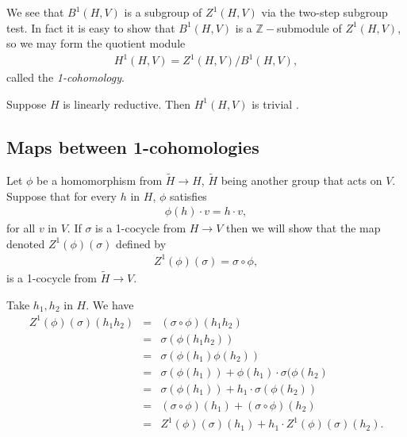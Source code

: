We see that $B^1(H, V)$ is a subgroup of $Z^1(H, V)$ via the two-step subgroup test. In fact it is easy to show that $B^1(H, V)$ is a $\mathbb{Z}-$submodule of $Z^1(H, V)$, so we may form the quotient module
\begin{eqnarray*}
	H^1\left(H, V\right) = Z^1\left(H, V\right) / B^1\left(H, V\right),
\end{eqnarray*}
called the \emph{1-cohomology}.
\begin{lemma} Suppose $H$ is linearly reductive. Then $H^1(H, V)$ is trivial \cite{hochschild1965structure}.
\end{lemma}

\subsection{Maps between 1-cohomologies}
Let $\phi$ be a homomorphism from $\tilde{H}\rightarrow H$, $\tilde{H}$ being another group that acts on $V$. Suppose that for every $h$ in $H$, $\phi$ satisfies
\begin{eqnarray*}
	\phi(h)\cdot v = h\cdot v,
\end{eqnarray*}
for all $v$ in $V$. If $\sigma$ is a 1-cocycle from $H\rightarrow V$ then we will show that the map denoted $Z^1(\phi)(\sigma)$ defined by
\begin{eqnarray*}
	Z^1(\phi)(\sigma) = \sigma \circ \phi,
\end{eqnarray*}
is a 1-cocycle from $\tilde{H}\rightarrow V$.

Take $h_1, h_2$ in $H$. We have
\begin{eqnarray*}
	Z^1(\phi)(\sigma)(h_1h_2) &=& (\sigma \circ \phi)(h_1h_2) \\
		&=& \sigma(\phi(h_1h_2)) \\
		&=& \sigma(\phi(h_1)\phi(h_2)) \\
		&=& \sigma(\phi(h_1)) + \phi(h_1)\cdot\sigma(\phi(h_2) \\
		&=& \sigma(\phi(h_1)) + h_1\cdot\sigma(\phi(h_2)) \\
		&=& (\sigma \circ \phi)(h_1) + (\sigma \circ \phi)(h_2) \\
		&=& Z^1(\phi)(\sigma)(h_1) + h_1\cdot Z^1(\phi)(\sigma)(h_2).
\end{eqnarray*}

